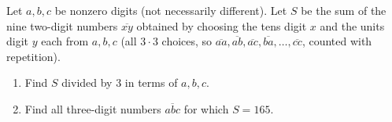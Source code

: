 Let $a,b,c$ be nonzero digits (not necessarily different). Let $S$ be the sum of the nine two-digit numbers $\overline{xy}$ obtained by choosing the tens digit $x$ and the units digit $y$ each from $a,b,c$ (all $3\cdot3$ choices, so $\overline{aa},\overline{ab},\overline{ac},\overline{ba},\dots,\overline{cc}$, counted with repetition).
\begin{enumerate}
\item[(a)] Find $S$ divided by $3$ in terms of $a,b,c$.
\item[(b)] Find all three-digit numbers $\overline{abc}$ for which $S=165$.
\end{enumerate}

